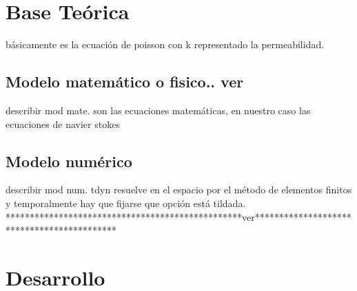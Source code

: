 \documentclass[10pt,a4paper,final]{article}
\begin{document}
\section{Base Teórica}
básicamente es la ecuación de poisson con k
representado la permeabilidad.
%
\subsection{Modelo matemático o fisico.. ver}
describir mod mate.
 son las ecuaciones matemáticas, en nuestro caso las
ecuaciones de navier stokes
%
\subsection{Modelo numérico}
describir mod num.
tdyn resuelve en el espacio por el método de
elementos finitos y 
temporalmente hay que fijarse que opción está
tildada. *************************************************ver*******************************************
\section{Desarrollo}
\end{document}
